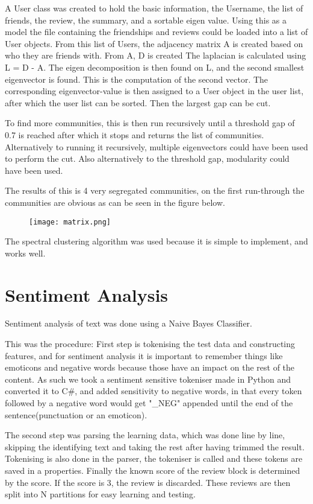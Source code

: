	A User class was created to hold the basic information, the Username, the list of friends, the review, the summary, and a sortable eigen value. 
	Using this as a model the file containing the friendships and reviews could be loaded into a list of User objects.
	From this list of Users, the adjacency matrix A is created based on who they are friends with.
	From A, D is created
	The laplacian is calculated using L = D - A. 
	The eigen decomposition is then found on L, and the second smallest eigenvector is found. This is the computation of the second vector.
	The corresponding eigenvector-value is then assigned to a User object in the user list, after which the user list can be sorted.
	Then the largest gap can be cut. 
	
	To find more communities, this is then run recursively until a threshold gap of 0.7 is reached after which it stops and returns the list of communities. Alternatively to running it recursively, multiple eigenvectors could have been used to perform the cut. Also alternatively to the threshold gap, modularity could have been used.
	
	The results of this is 4 very segregated communities, on the first run-through the communities are obvious as can be seen in the figure below.
	
	\begin{figure}[H]
	\texttt{[image: matrix.png]}
	\end{figure}
	
	The spectral clustering algorithm was used because it is simple to implement, and works well.
	
	\section{Sentiment Analysis}
	Sentiment analysis of text was done using a Naive Bayes Classifier.
	
	This was the procedure:
	First step is tokenising the test data and constructing features, and for sentiment analysis it is important to remember things like emoticons and negative words because those have an impact on the rest of the content. As such we took a sentiment sensitive tokeniser made in Python and converted it to C\#, and added sensitivity to negative words, in that every token followed by a negative word would get "\_NEG" appended until the end of the sentence(punctuation or an emoticon).
	
	The second step was parsing the learning data, which was done line by line, skipping the identifying text and taking the rest after having trimmed the result. Tokenising is also done in the parser, the tokeniser is called and these tokens are saved in a properties. Finally the known score of the review block is determined by the score. If the score is 3, the review is discarded. These reviews are then split into N partitions for easy learning and testing.
	
